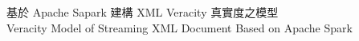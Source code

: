 \begin{titlepage}
\begin{center}
 
\begin{minipage}[b]{0.5\textwidth}
\centering
{}\\  
\vspace{0.5cm}
\\ 
\vspace{0.5cm}
\end{minipage}%

\vspace{1cm}
\vspace{1cm}

\renewcommand{\baselinestretch}{1}
\Huge{基於 Apache Sapark 建構 XML Veracity 真實度之模型}\\
\vspace{1cm}
\huge{Veracity Model of Streaming XML Document Based on Apache Spark}

\end{center}
\end{titlepage}